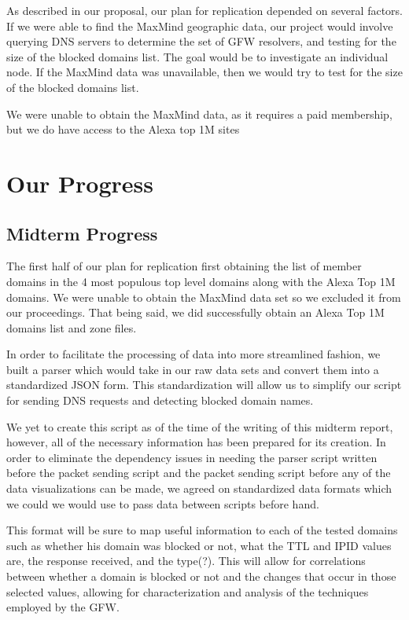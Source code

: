 \documentclass[format=acmsmall, screen=true]{acmart}
\begin{document}
As described in our proposal, our plan for replication depended on several factors. If we were able to find the MaxMind geographic data, our project would involve querying DNS servers to determine the set of GFW resolvers, and testing for the size of the blocked domains list. The goal would be to investigate an individual node. If the MaxMind data was unavailable, then we would try to test for the size of the blocked domains list. 

We were unable to obtain the MaxMind data, as it requires a paid membership, but we do have access to the Alexa top 1M sites


\section{Our Progress}



\subsection{Midterm Progress}

The first half of our plan for replication first obtaining the list of member domains in the 4 most populous top level domains along with the Alexa Top 1M domains. We were unable to obtain the MaxMind data set so we excluded it from our proceedings. That being said, we did successfully obtain an Alexa Top 1M domains list and zone files. 

In order to facilitate the processing of data into more streamlined fashion, we built a parser which would take in our raw data sets and convert them into a standardized JSON form. This standardization will allow us to simplify our script for sending DNS requests and detecting blocked domain names. 

We yet to create this script as of the time of the writing of this midterm report, however, all of the necessary information has been prepared for its creation. In order to eliminate the dependency issues in needing the parser script written before the packet sending script and the packet sending script before any of the data visualizations can be made, we agreed on standardized data formats which we could we would use to pass data between scripts before hand.

This format will be sure to map useful information to each of the tested domains such as whether his domain was blocked or not, what the TTL and IPID values are, the response received, and the type(?). This will allow for correlations between whether a domain is blocked or not and the changes that occur in those selected values, allowing for characterization and analysis of the techniques employed by the GFW. 
\end{document}
